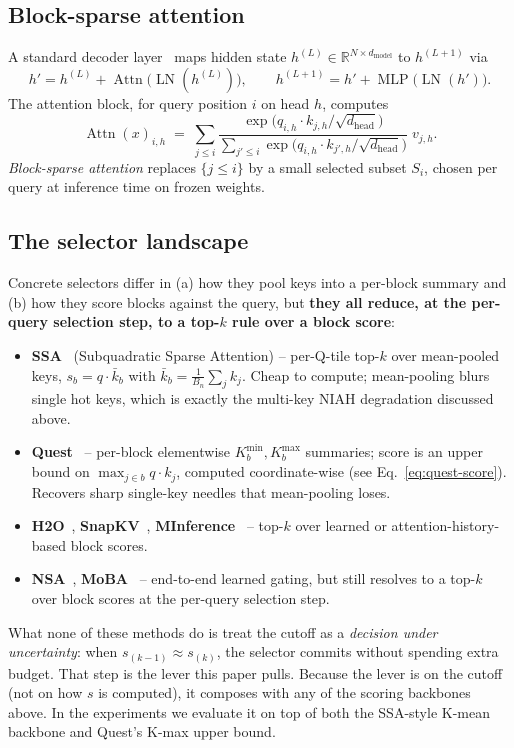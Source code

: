 \documentclass[11pt]{article}
\theoremstyle{remark}
\newcommand{\dhead}{d_{\text{head}}}
\begin{document}
\subsection{Block-sparse attention}

A standard decoder layer~\citep{vaswani2017attention} maps hidden state $h^{(L)} \in \mathbb{R}^{N \times d_{\text{model}}}$ to $h^{(L+1)}$ via
\[
h' = h^{(L)} + \operatorname{Attn}\bigl(\operatorname{LN}(h^{(L)})\bigr),\qquad
h^{(L+1)} = h' + \operatorname{MLP}\bigl(\operatorname{LN}(h')\bigr).
\]
The attention block, for query position $i$ on head $h$, computes
\[
\operatorname{Attn}(x)_{i,h} \;=\; \sum_{j \le i} \frac{\exp\!\bigl(q_{i,h}\!\cdot\!k_{j,h}/\sqrt{\dhead}\bigr)}{\sum_{j' \le i}\exp\!\bigl(q_{i,h}\!\cdot\!k_{j',h}/\sqrt{\dhead}\bigr)}\; v_{j,h}.
\]
\emph{Block-sparse attention} replaces $\{j \le i\}$ by a small selected subset $S_i$, chosen per query at inference time on frozen weights.

\subsection{The selector landscape}

Concrete selectors differ in (a) how they pool keys into a per-block summary and (b) how they score blocks against the query, but \textbf{they all reduce, at the per-query selection step, to a top-$k$ rule over a block score}:
\begin{itemize}[leftmargin=*,topsep=0.2em,itemsep=0.1em]
    \item \textbf{SSA}~\citep{ssa2025} (Subquadratic Sparse Attention) -- per-Q-tile top-$k$ over mean-pooled keys, $s_b = q \cdot \bar k_b$ with $\bar k_b = \frac{1}{B_n}\sum_j k_j$. Cheap to compute; mean-pooling blurs single hot keys, which is exactly the multi-key NIAH degradation discussed above.
    \item \textbf{Quest}~\citep{tang2024quest} -- per-block elementwise $K^{\min}_b, K^{\max}_b$ summaries; score is an upper bound on $\max_{j \in b} q \cdot k_j$, computed coordinate-wise (see Eq.~\ref{eq:quest-score}). Recovers sharp single-key needles that mean-pooling loses.
    \item \textbf{H2O}~\citep{zhang2023h2o}, \textbf{SnapKV}~\citep{li2024snapkv}, \textbf{MInference}~\citep{jiang2024minference} -- top-$k$ over learned or attention-history-based block scores.
    \item \textbf{NSA}~\citep{yuan2025nsa}, \textbf{MoBA}~\citep{lu2025moba} -- end-to-end learned gating, but still resolves to a top-$k$ over block scores at the per-query selection step.
\end{itemize}
What none of these methods do is treat the cutoff as a \emph{decision under uncertainty}: when $s_{(k-1)} \approx s_{(k)}$, the selector commits without spending extra budget. That step is the lever this paper pulls. Because the lever is on the cutoff (not on how $s$ is computed), it composes with any of the scoring backbones above. In the experiments we evaluate it on top of both the SSA-style K-mean backbone and Quest's K-max upper bound.
\end{document}
